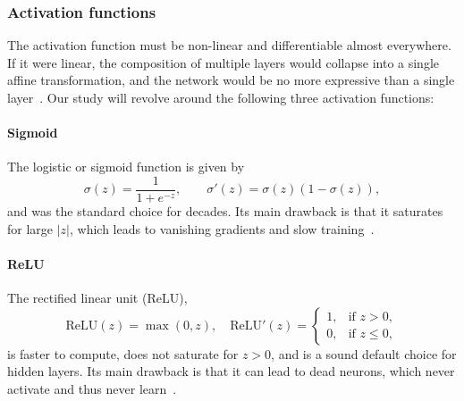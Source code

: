 \subsubsection{Activation functions}



The activation function must be non-linear and differentiable almost everywhere.
If it were linear, the composition of multiple layers would collapse into a single
affine transformation, and the network would be no more expressive than a single
layer~\cite{hjorth-jensen_2026}.
Our study will revolve around the following three activation functions:

\paragraph{Sigmoid} The logistic or sigmoid function is given by
\begin{equation*}
    \sigma(z) = \frac{1}{1+e^{-z}}, \qquad \sigma'(z) = \sigma (z) (1 - \sigma (z)),
\end{equation*}
and was the standard choice for decades. Its main drawback is that it saturates for
large $|z|$, which leads to vanishing gradients and slow training~\cite{hjorth-jensen_2026}.

\paragraph{ReLU} The rectified linear unit (ReLU),
\begin{equation*}
    \mathrm{ReLU}(z) = \max (0, z),
    \quad \mathrm{ReLU}'(z) =
    \begin{cases}
        1, & \text{if } z>0, \\
        0, & \text{if } z\leq 0,
    \end{cases}
\end{equation*}
is faster to compute, does not saturate for $z>0$, and is a sound default choice for hidden layers.
Its main drawback is that it can lead to dead neurons, which never activate and thus never learn~\cite{hjorth-jensen_2026}.

